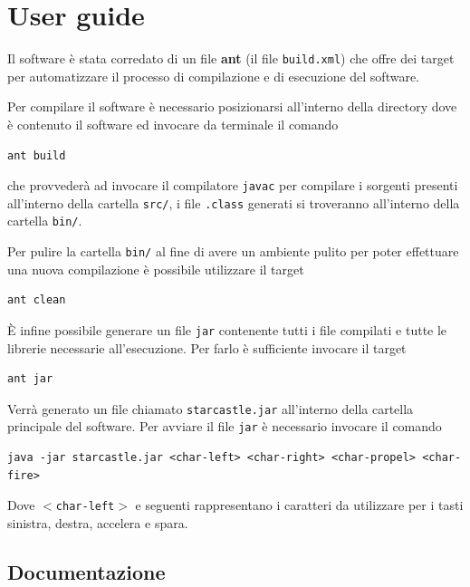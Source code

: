 \documentclass[a4paper,12pt]{article}
\begin{document}
\section{User guide}
\label{sec:guide}

Il software \`e stata corredato di un file \textbf{ant} (il file \texttt{build.xml}) che offre dei target per automatizzare il processo di compilazione e di esecuzione del software.

Per compilare il software \`e necessario posizionarsi all'interno della directory dove \`e contenuto il software ed invocare da terminale il comando

\begin{lstlisting}[basicstyle=\ttfamily]
ant build
\end{lstlisting}

che provveder\`a ad invocare il compilatore \texttt{javac} per compilare i sorgenti presenti all'interno della cartella \texttt{src/}, i file \texttt{.class} generati si troveranno all'interno della cartella \texttt{bin/}. 

Per pulire la cartella \texttt{bin/} al fine di avere un ambiente pulito per poter effettuare una nuova compilazione \`e possibile utilizzare il target
\begin{lstlisting}[basicstyle=\ttfamily]
ant clean
\end{lstlisting}

\`E infine possibile generare un file \texttt{jar} contenente tutti i file compilati e tutte le librerie necessarie all'esecuzione. Per farlo \`e sufficiente invocare il target
\begin{lstlisting}[basicstyle=\ttfamily]
ant jar
\end{lstlisting}
Verr\`a generato un file chiamato \texttt{starcastle.jar} all'interno della cartella principale del software.
Per avviare il file \texttt{jar} \`e necessario invocare il comando
\begin{lstlisting}[basicstyle=\ttfamily]
java -jar starcastle.jar <char-left> <char-right> <char-propel> <char-fire>
\end{lstlisting}

Dove $<$\texttt{char-left}$>$ e seguenti rappresentano i caratteri da utilizzare per i tasti sinistra, destra, accelera e spara.

\subsection{Documentazione}
\end{document}
